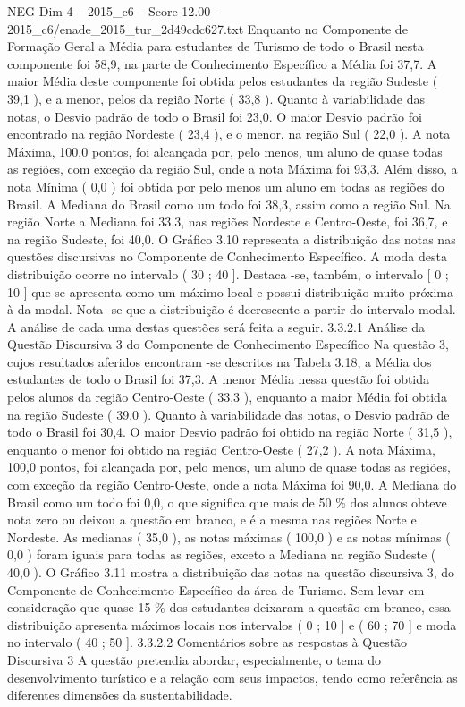 \begin{textsample}{NEG Dim 4 – 2015\_c6 – Score 12.00 – 2015\_c6/enade\_2015\_tur\_2d49cdc627.txt}
Enquanto no Componente de Formação Geral a Média para estudantes de Turismo de todo o Brasil nesta componente foi 58,9, na parte de Conhecimento Específico a Média foi 37,7.
A maior Média deste componente foi obtida pelos estudantes da região Sudeste ( 39,1 ), e a menor, pelos da região Norte ( 33,8 ).
Quanto à variabilidade das notas, o Desvio padrão de todo o Brasil foi 23,0.
O maior Desvio padrão foi encontrado na região Nordeste ( 23,4 ), e o menor, na região Sul ( 22,0 ).
A nota Máxima, 100,0 pontos, foi alcançada por, pelo menos, um aluno de quase todas as regiões, com exceção da região Sul, onde a nota Máxima foi 93,3.
Além disso, a nota Mínima ( 0,0 ) foi obtida por pelo menos um aluno em todas as regiões do Brasil.
A Mediana do Brasil como um todo foi 38,3, assim como a região Sul.
Na região Norte a Mediana foi 33,3, nas regiões Nordeste e Centro-Oeste, foi 36,7, e na região Sudeste, foi 40,0.
O Gráfico 3.10 representa a distribuição das notas nas questões discursivas no Componente de Conhecimento Específico.
A moda desta distribuição ocorre no intervalo ( 30 ; 40 ].
Destaca -se, também, o intervalo [ 0 ; 10 ] que se apresenta como um máximo local e possui distribuição muito próxima à da modal.
Nota -se que a distribuição é decrescente a partir do intervalo modal.
A análise de cada uma destas questões será feita a seguir. 3.3.2.1 Análise da Questão Discursiva 3 do Componente de Conhecimento Específico Na questão 3, cujos resultados aferidos encontram -se descritos na Tabela 3.18, a Média dos estudantes de todo o Brasil foi 37,3.
A menor Média nessa questão foi obtida pelos alunos da região Centro-Oeste ( 33,3 ), enquanto a maior Média foi obtida na região Sudeste ( 39,0 ).
Quanto à variabilidade das notas, o Desvio padrão de todo o Brasil foi 30,4.
O maior Desvio padrão foi obtido na região Norte ( 31,5 ), enquanto o menor foi obtido na região Centro-Oeste ( 27,2 ).
A nota Máxima, 100,0 pontos, foi alcançada por, pelo menos, um aluno de quase todas as regiões, com exceção da região Centro-Oeste, onde a nota Máxima foi 90,0.
A Mediana do Brasil como um todo foi 0,0, o que significa que mais de 50 \% dos alunos obteve nota zero ou deixou a questão em branco, e é a mesma nas regiões Norte e Nordeste.
As medianas ( 35,0 ), as notas máximas ( 100,0 ) e as notas mínimas ( 0,0 ) foram iguais para todas as regiões, exceto a Mediana na região Sudeste ( 40,0 ).
O Gráfico 3.11 mostra a distribuição das notas na questão discursiva 3, do Componente de Conhecimento Específico da área de Turismo.
Sem levar em consideração que quase 15 \% dos estudantes deixaram a questão em branco, essa distribuição apresenta máximos locais nos intervalos ( 0 ; 10 ] e ( 60 ; 70 ] e moda no intervalo ( 40 ; 50 ]. 3.3.2.2 Comentários sobre as respostas à Questão Discursiva 3 A questão pretendia abordar, especialmente, o tema do desenvolvimento turístico e a relação com seus impactos, tendo como referência as diferentes dimensões da sustentabilidade.

\end{textsample}
